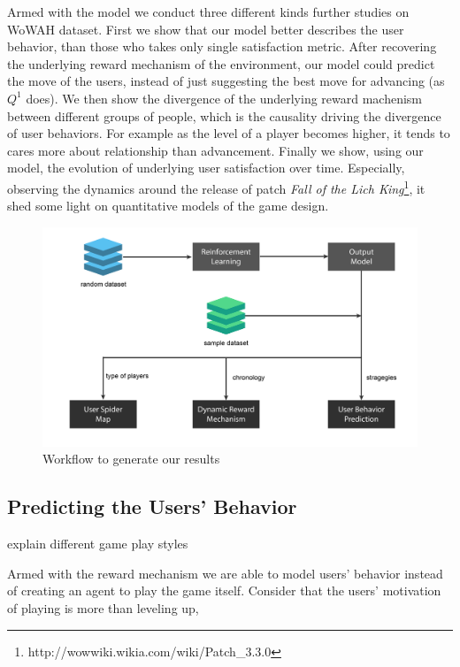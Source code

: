 \documentclass{sigchi}
\begin{document}
Armed with the model we conduct three different kinds further studies on WoWAH dataset. First we show that our model better describes the user behavior, than those who takes only single satisfaction metric. After recovering the underlying reward mechanism of the environment, our model could predict the move of the users, instead of just suggesting the best move for advancing (as $Q^1$ does). We then show the divergence of the underlying reward machenism between different groups of people, which is the causality driving the divergence of user behaviors. For example as the level of a player becomes higher, it tends to cares more about relationship than advancement. Finally we show, using our model, the evolution of underlying user satisfaction over time. Especially, observing the dynamics around the release of patch \textit{Fall of the Lich King}\footnote{http://wowwiki.wikia.com/wiki/Patch\_3.3.0}, it shed some light on quantitative models of the game design.

\begin{figure}[t]
    \centering
    \includegraphics[width=\textwidth]{figs/results.jpg}
    \caption{Workflow to generate our results}
    \label{fig:results}
\end{figure}


\subsection{Predicting the Users' Behavior}

explain different game play styles

Armed with the reward mechanism we are able to model users' behavior instead of creating an agent to play the game itself. 
Consider that the users' motivation of playing is more than leveling up, 
\end{document}
